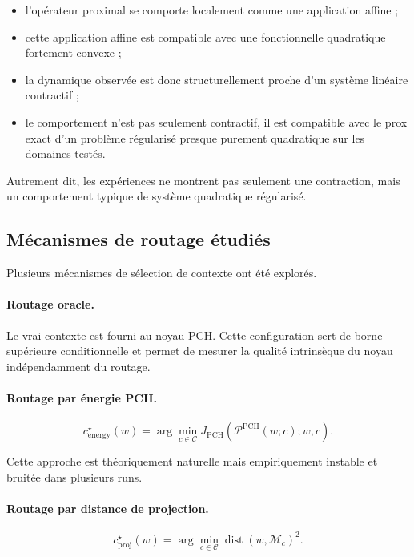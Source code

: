 \documentclass[11pt,a4paper]{article}
\newcommand{\1}{\mathbf 1}
\begin{document}
\begin{itemize}[leftmargin=2em]
\item l’opérateur proximal se comporte localement comme une application affine ;
\item cette application affine est compatible avec une fonctionnelle quadratique fortement convexe ;
\item la dynamique observée est donc structurellement proche d’un système linéaire contractif ;
\item le comportement n’est pas seulement contractif, il est compatible avec le prox exact d’un problème régularisé presque purement quadratique sur les domaines testés.
\end{itemize}

Autrement dit, les expériences ne montrent pas seulement une contraction, mais un comportement typique de système quadratique régularisé.

\subsection{Mécanismes de routage étudiés}

Plusieurs mécanismes de sélection de contexte ont été explorés.

\paragraph{Routage oracle.}
Le vrai contexte est fourni au noyau PCH. Cette configuration sert de borne supérieure conditionnelle et permet de mesurer la qualité intrinsèque du noyau indépendamment du routage.

\paragraph{Routage par énergie PCH.}
\[
c^\star_{\mathrm{energy}}(w)
=
\arg\min_{c\in\mathcal C}
J_{\mathrm{PCH}}(\mathcal P^{\mathrm{PCH}}(w;c);w,c).
\]

Cette approche est théoriquement naturelle mais empiriquement instable et bruitée dans plusieurs runs.

\paragraph{Routage par distance de projection.}
\[
c^\star_{\mathrm{proj}}(w)
=
\arg\min_{c\in\mathcal C}\operatorname{dist}(w,\mathcal M_c)^2.
\]
\end{document}

